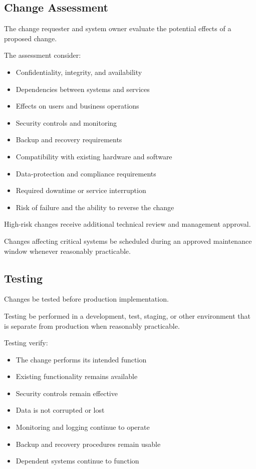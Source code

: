 \subsection{Change Assessment}

The change requester and system owner \must{} evaluate the potential effects of a proposed change.

The assessment \should{} consider:
\begin{itemize}
    \item Confidentiality, integrity, and availability
    \item Dependencies between systems and services
    \item Effects on users and business operations
    \item Security controls and monitoring
    \item Backup and recovery requirements
    \item Compatibility with existing hardware and software
    \item Data-protection and compliance requirements
    \item Required downtime or service interruption
    \item Risk of failure and the ability to reverse the change
\end{itemize}

High-risk changes \should{} receive additional technical review and management approval.

Changes affecting critical systems \should{} be scheduled during an approved maintenance window whenever reasonably practicable.

\subsection{Testing}

Changes \should{} be tested before production implementation.

Testing \should{} be performed in a development, test, staging, or other environment that is separate from production when reasonably practicable.

Testing \should{} verify:
\begin{itemize}
    \item The change performs its intended function
    \item Existing functionality remains available
    \item Security controls remain effective
    \item Data is not corrupted or lost
    \item Monitoring and logging continue to operate
    \item Backup and recovery procedures remain usable
    \item Dependent systems continue to function
\end{itemize}

